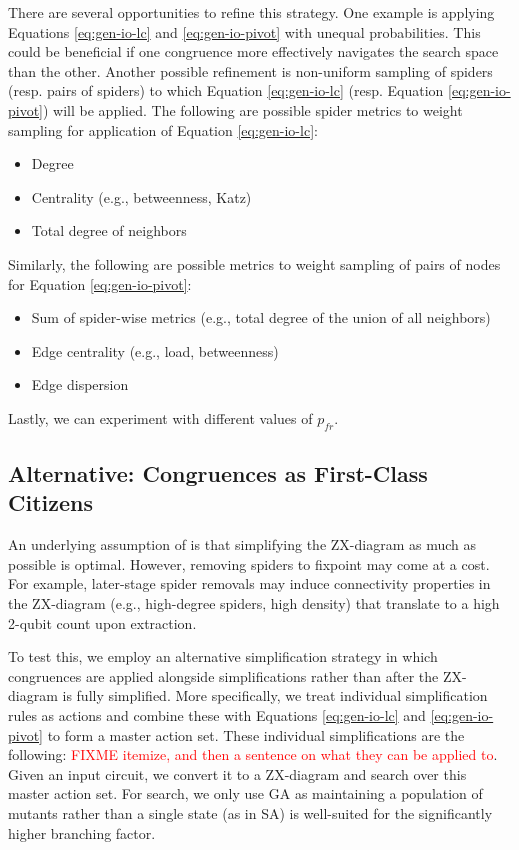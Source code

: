 There are several opportunities to refine this strategy.
One example is applying Equations \ref{eq:gen-io-lc} and \ref{eq:gen-io-pivot} with unequal probabilities.
This could be beneficial if one congruence more effectively navigates the search space than the other.
Another possible refinement is non-uniform sampling of spiders (resp. pairs of spiders) to which Equation \ref{eq:gen-io-lc} (resp. Equation \ref{eq:gen-io-pivot}) will be applied.
The following are possible spider metrics to weight sampling for application of Equation \ref{eq:gen-io-lc}:
\begin{itemize}
\item
  Degree
\item
  Centrality (e.g., betweenness, Katz)
\item
  Total degree of neighbors
\end{itemize}
Similarly, the following are possible metrics to weight sampling of pairs of nodes for Equation \ref{eq:gen-io-pivot}:
\begin{itemize}
\item
  Sum of spider-wise metrics (e.g., total degree of the union of all neighbors)
\item
  Edge centrality (e.g., load, betweenness)
\item
  Edge dispersion
\end{itemize}
Lastly, we can experiment with different values of $p_{fr}$.


\subsection{Alternative: Congruences as First-Class Citizens}

An underlying assumption of  is that simplifying the ZX-diagram as much as possible is optimal.
However, removing spiders to fixpoint may come at a cost.
For example, later-stage spider removals may induce connectivity properties in the ZX-diagram (e.g., high-degree spiders, high density) that translate to a high 2-qubit count upon extraction.

To test this, we employ an alternative simplification strategy in which congruences are applied alongside simplifications rather than after the ZX-diagram is fully simplified.
More specifically, we treat individual simplification rules as actions and combine these with Equations \ref{eq:gen-io-lc} and \ref{eq:gen-io-pivot} to form a master action set.
These individual simplifications are the following: \textcolor{red}{FIXME itemize, and then a sentence on what they can be applied to}.
Given an input circuit, we convert it to a ZX-diagram and search over this master action set.
For search, we only use GA as maintaining a population of mutants rather than a single state (as in SA) is well-suited for the significantly higher branching factor.

